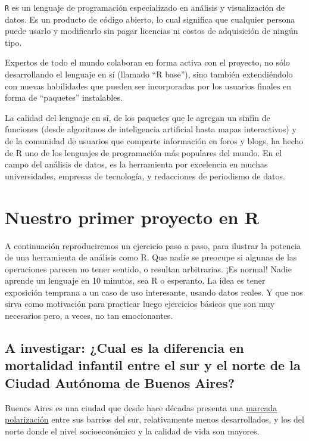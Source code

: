 \documentclass[
]{book}
\begin{document}
\texttt{R} es un lenguaje de programación especializado en análisis y visualización de datos. Es un producto de código abierto, lo cual significa que cualquier persona puede usarlo y modificarlo sin pagar licencias ni costos de adquisición de ningún tipo.

Expertos de todo el mundo colaboran en forma activa con el proyecto, no sólo desarrollando el lenguaje en sí (llamado ``R base''), sino también extendiéndolo con nuevas habilidades que pueden ser incorporadas por los usuarios finales en forma de ``paquetes'' instalables.

La calidad del lenguaje en sí, de los paquetes que le agregan un sinfín de funciones (desde algoritmos de inteligencia artificial hasta mapas interactivos) y de la comunidad de usuarios que comparte información en foros y blogs, ha hecho de R uno de los lenguajes de programación más populares del mundo. En el campo del análisis de datos, es la herramienta por excelencia en muchas universidades, empresas de tecnología, y redacciones de periodismo de datos.

\hypertarget{nuestro-primer-proyecto-en-r}{%
\section{Nuestro primer proyecto en R}\label{nuestro-primer-proyecto-en-r}}

A continuación reproduciremos un ejercicio paso a paso, para ilustrar la potencia de una herramienta de análisis como R. Que nadie se preocupe si algunas de las operaciones parecen no tener sentido, o resultan arbitrarias. ¡Es normal! Nadie aprende un lenguaje en 10 minutos, sea R o esperanto. La idea es tener exposición temprana a un caso de uso interesante, usando datos reales. Y que nos sirva como motivación para practicar luego ejercicios básicos que son muy necesarios pero, a veces, no tan emocionantes.

\hypertarget{a-investigar-cual-es-la-diferencia-en-mortalidad-infantil-entre-el-sur-y-el-norte-de-la-ciudad-autuxf3noma-de-buenos-aires}{%
\subsection{A investigar: ¿Cual es la diferencia en mortalidad infantil entre el sur y el norte de la Ciudad Autónoma de Buenos Aires?}\label{a-investigar-cual-es-la-diferencia-en-mortalidad-infantil-entre-el-sur-y-el-norte-de-la-ciudad-autuxf3noma-de-buenos-aires}}

Buenos Aires es una ciudad que desde hace décadas presenta una \href{https://elpais.com/internacional/2016/10/16/argentina/1476629610_416732.html}{marcada polarización} entre sus barrios del sur, relativamente menos desarrollados, y los del norte donde el nivel socioeconómico y la calidad de vida son mayores.
\end{document}
